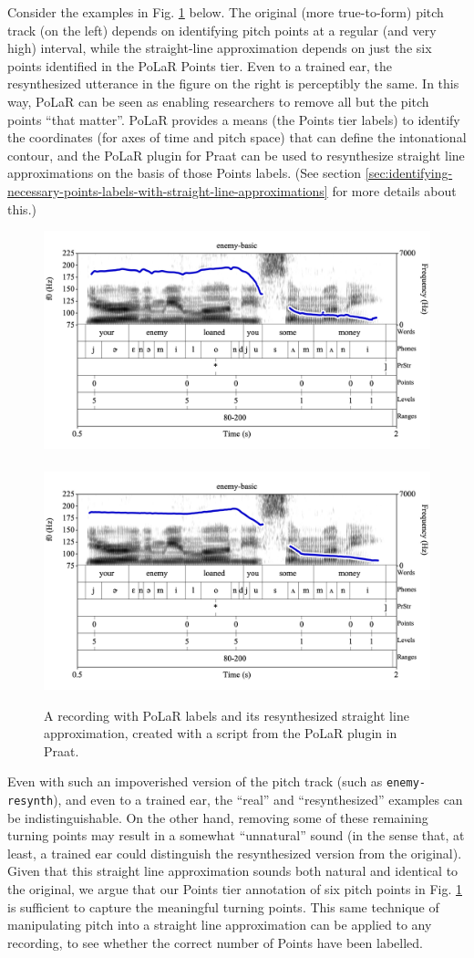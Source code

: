 \documentclass[11pt, twoside]{memoir}
\begin{document}
Consider the examples in Fig. \ref{fig:enemy original and resynth} below. The original (more true-to-form) pitch track (on the left) depends on identifying pitch points at a regular (and very high) interval, while the straight-line approximation depends on just the six points identified in the PoLaR Points tier. Even to a trained ear, the resynthesized utterance in the figure on the right is perceptibly the same. In this way, PoLaR can be seen as enabling researchers to remove all but the pitch points “that matter”. PoLaR provides a means (the Points tier labels) to identify the coordinates (for axes of time and pitch space) that can define the intonational contour, and the PoLaR plugin for Praat can be used to resynthesize straight line approximations on the basis of those Points labels. (See section \ref{sec:identifying-necessary-points-labels-with-straight-line-approximations} for more details about this.)
\begin{figure}[H]
\centering
\includegraphics[width=.485\linewidth]{Contours-enemy.png}~~\includegraphics[width=.485\linewidth]{Contours-enemy-resynth.png}
\caption{A recording with PoLaR labels and its resynthesized straight line approximation, created with a script from the PoLaR plugin in Praat.
\label{fig:enemy original and resynth}
}
\end{figure}
Even with such an impoverished version of the pitch track (such as \texttt{enemy-resynth}), and even to a trained ear, the “real” and “resynthesized” examples can be indistinguishable. On the other hand, removing some of these remaining turning points may result in a somewhat “unnatural” sound (in the sense that, at least, a trained ear could distinguish the resynthesized version from the original). Given that this straight line approximation sounds both natural and identical to the original, we argue that our Points tier annotation of six pitch points in Fig. \ref{fig:enemy original and resynth} is sufficient to capture the meaningful turning points. This same technique of manipulating pitch into a straight line approximation can be applied to any recording, to see whether the correct number of Points have been labelled.
\end{document}
